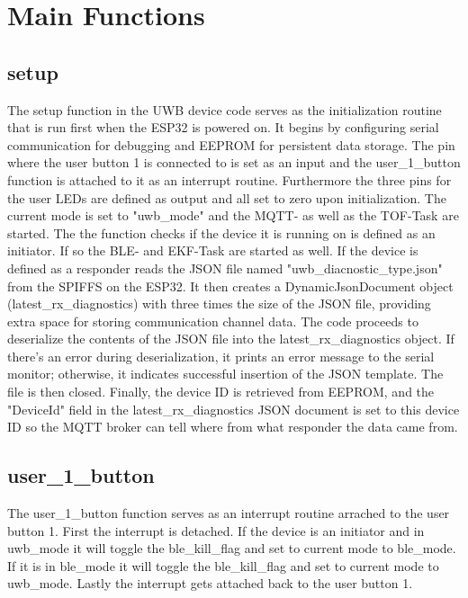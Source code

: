 \section{Main Functions}
\label{sec:Main_Functions}

\subsection{setup}
\label{subsec:setup}
The setup function in the UWB device code serves as the initialization routine that is run first when the ESP32 is powered on. 
It begins by configuring serial communication for debugging and EEPROM for persistent data storage. 
The pin where the user button 1 is connected to is set as an input and the user\_1\_button function is attached to it as an interrupt routine. 
Furthermore the three pins for the user LEDs are defined as output and all set to zero upon initialization. 
The current mode is set to "uwb\_mode" and the MQTT- as well as the TOF-Task are started. 
\vspace{4pt}
\newline
The the function checks if the device it is running on is defined as an initiator. 
If so the BLE- and EKF-Task are started as well. 
\vspace{4pt}
\newline
If the device is defined as a responder reads the JSON file named "uwb\_diacnostic\_type.json" from the SPIFFS on the ESP32.
It then creates a DynamicJsonDocument object (latest\_rx\_diagnostics) with three times the size of the JSON file, providing extra space for storing communication channel data.
The code proceeds to deserialize the contents of the JSON file into the latest\_rx\_diagnostics object. If there's an error during deserialization, it prints an error message to the serial monitor; otherwise, it indicates successful insertion of the JSON template. The file is then closed. Finally, the device ID is retrieved from EEPROM, and the "DeviceId" field in the latest\_rx\_diagnostics JSON document is set to this device ID so the MQTT broker can tell where from what responder the data came from. 

\subsection{user\_1\_button}
\label{subsec:user_1_button}
The user\_1\_button function serves as an interrupt routine arrached to the user button 1. 
First the interrupt is detached. 
If the device is an initiator and in uwb\_mode it will toggle the ble\_kill\_flag and set to current mode to ble\_mode. 
If it is in ble\_mode it will toggle the ble\_kill\_flag and set to current mode to uwb\_mode. 
Lastly the interrupt gets attached back to the user button 1. 

